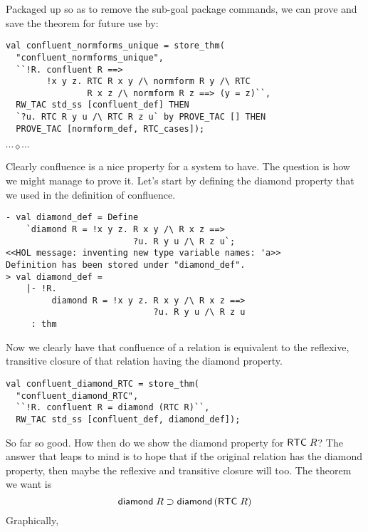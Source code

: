 \documentclass[12pt]{article}
\newcommand{\eos}{\hfill{}$\cdots\diamond\cdots$\hfill{}\vspace{5mm}}
\begin{document}
Packaged up so as to remove the sub-goal package commands, we can
prove and save the theorem for future use by:
\begin{session}\begin{verbatim}
val confluent_normforms_unique = store_thm(
  "confluent_normforms_unique",
  ``!R. confluent R ==>
        !x y z. RTC R x y /\ normform R y /\ RTC
                R x z /\ normform R z ==> (y = z)``,
  RW_TAC std_ss [confluent_def] THEN
  `?u. RTC R y u /\ RTC R z u` by PROVE_TAC [] THEN
  PROVE_TAC [normform_def, RTC_cases]);
\end{verbatim}\end{session}
\eos{}

Clearly confluence is a nice property for a system to have.  The
question is how we might manage to prove it.  Let's start by defining
the diamond property that we used in the definition of confluence.
\begin{session}\begin{verbatim}
- val diamond_def = Define
    `diamond R = !x y z. R x y /\ R x z ==>
                         ?u. R y u /\ R z u`;
<<HOL message: inventing new type variable names: 'a>>
Definition has been stored under "diamond_def".
> val diamond_def =
    |- !R.
         diamond R = !x y z. R x y /\ R x z ==>
                             ?u. R y u /\ R z u
     : thm
\end{verbatim}\end{session}
    Now we clearly have that confluence of a relation is equivalent to
    the reflexive, transitive closure of that relation having the
    diamond property.
\begin{session}\begin{verbatim}
val confluent_diamond_RTC = store_thm(
  "confluent_diamond_RTC",
  ``!R. confluent R = diamond (RTC R)``,
  RW_TAC std_ss [confluent_def, diamond_def]);
\end{verbatim}\end{session}
    So far so good.  How then do we show the diamond property for
    ${\sf RTC}\;R$?  The answer that leaps to mind is to hope that if
    the original relation has the diamond property, then maybe the
    reflexive and transitive closure will too.  The theorem we want is
    \[ {\sf diamond}\;R \supset {\sf diamond}\,({\sf RTC}\;R)\] Graphically,
\end{document}
